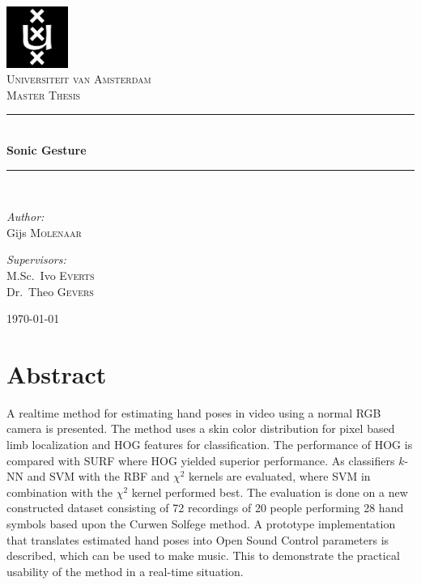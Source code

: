 \documentclass[a4paper, 11pt]{book}
\newcommand{\HRule}{\rule{\linewidth}{0.5mm}}
\begin{document}

\begin{titlepage}
\begin{center}

\includegraphics[width=0.15\textwidth]{./figures/uva.png}\\[1cm]
\textsc{\LARGE Universiteit van Amsterdam}\\[1.5cm]
\textsc{\Large Master Thesis}\\[0.5cm]

\HRule \\[0.4cm]
{ \huge \bfseries Sonic Gesture}\\[0.4cm]

\HRule \\[1.5cm]

\begin{minipage}{0.4\textwidth}
\begin{flushleft} \large
\emph{Author:}\\
Gijs \textsc{Molenaar}
\end{flushleft}
\end{minipage}
\begin{minipage}{0.4\textwidth}
\begin{flushright} \large
\emph{Supervisors:} \\
M.Sc.~Ivo \textsc{Everts} \\
Dr.~Theo \textsc{Gevers}
\end{flushright}
\end{minipage}

\vfill

{\large \today}

\end{center}
\end{titlepage}


\chapter*{Abstract}
A real\-time method for estimating hand poses in video using a normal RGB camera is presented. The method uses a skin color distribution for pixel based limb localization and HOG features for classification. The performance of HOG is compared with SURF where HOG yielded superior performance. As classifiers $k$-NN and SVM with the RBF and $\chi^2$ kernels are evaluated, where SVM in combination with the $\chi^2$ kernel performed best. The evaluation is done on a new constructed dataset consisting of 72 recordings of 20 people performing 28 hand symbols based upon the Curwen Solfege method. A prototype implementation that translates estimated hand poses into Open Sound Control parameters is described, which can be used to make music. This to demonstrate the practical usability of the method in a real-time situation.
\end{document}
